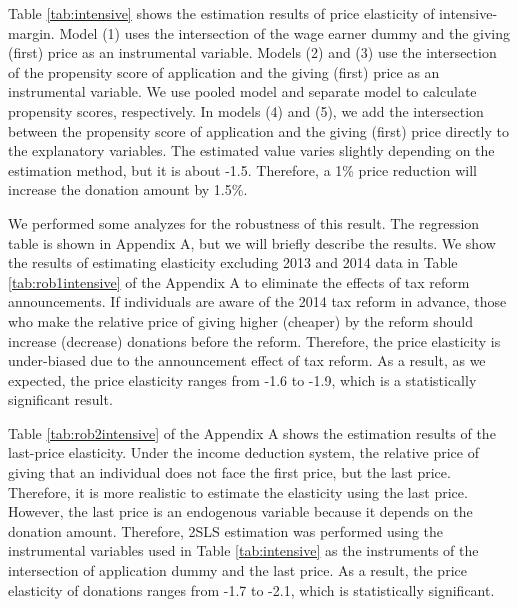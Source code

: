 \documentclass[
  11pt,
  a4paper,
]{article}
\begin{document}
Table \ref{tab:intensive} shows
the estimation results of price elasticity of intensive-margin.
Model (1) uses the intersection of the wage earner dummy and
the giving (first) price as an instrumental variable.
Models (2) and (3) use
the intersection of the propensity score of application and
the giving (first) price as an instrumental variable.
We use pooled model and separate model to calculate propensity scores,
respectively.
In models (4) and (5), we add the intersection between
the propensity score of application and the giving (first) price
directly to the explanatory variables.
The estimated value varies slightly depending on the estimation method,
but it is about -1.5.
Therefore, a 1\% price reduction will increase the donation amount by 1.5\%.

We performed some analyzes for the robustness of this result.
The regression table is shown in Appendix A,
but we will briefly describe the results.
We show the results of estimating elasticity excluding 2013 and 2014 data
in Table \ref{tab:rob1intensive} of the Appendix A
to eliminate the effects of tax reform announcements.
If individuals are aware of the 2014 tax reform in advance,
those who make the relative price of giving higher (cheaper)
by the reform should increase (decrease) donations before the reform.
Therefore, the price elasticity is under-biased
due to the announcement effect of tax reform.
As a result, as we expected,
the price elasticity ranges from -1.6 to -1.9,
which is a statistically significant result.

Table \ref{tab:rob2intensive} of the Appendix A shows
the estimation results of the last-price elasticity.
Under the income deduction system,
the relative price of giving that an individual
does not face the first price, but the last price.
Therefore, it is more realistic to estimate the elasticity
using the last price.
However, the last price is an endogenous variable
because it depends on the donation amount.
Therefore, 2SLS estimation was performed using the instrumental variables
used in Table \ref{tab:intensive} as the instruments of
the intersection of application dummy and the last price.
As a result, the price elasticity of donations ranges from -1.7 to -2.1,
which is statistically significant.
\end{document}

